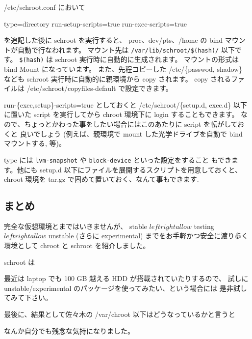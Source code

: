 \documentclass[mingoth,a4paper]{jsarticle}
\begin{document}
/etc/schroot.conf において
\begin{commandline}
type=directory
run-setup-scripts=true
run-exec-scripts=true
\end{commandline}
を追記した後に schroot を実行すると、
proc、dev/pts、/home の bind マウントが自動で行なわれます。
マウント先は {\tt /var/lib/schroot/\$(hash)/} 以下です。
{\tt \$(hash)} は schroot 実行時に自動的に生成されます。
マウントの形式は bind Mount になっています。
また、先程コピーした /etc/\{passwod, shadow\} なども
schroot 実行時に自動的に親環境から copy されます。
copy されるファイルは /etc/schroot/copyfiles-default で設定できます。

run-\{exec,setup\}-scripts=true としておくと
/etc/schroot/\{setup.d, exec.d\} 以下に置いた script を実行してから
chroot 環境下に login することもできます。
なので、ちょっとかわった事をしたい場合にはこのあたりに script を転がしておくと
良いでしょう
(例えば、親環境で mount した光学ドライブを自動で bind マウントする, 等)。

type には {\tt lvm-snapshot} や {\tt block-device} といった設定をすること
もできます。他にも setup.d 以下にファイルを展開するスクリプトを用意しておくと、
chroot 環境を tar.gz で固めて置いておく、なんて事もできます.

\subsection{まとめ}

完全な仮想環境とまではいきませんが、
stable $leftrightallow$
testing $leftrightallow$
unstable (さらに experimental) までをお手軽かつ安全に渡り歩く環境として
chroot と schroot を紹介しました。

schroot は

最近は laptop でも 100 GB 越える HDD が搭載されていたりするので、
試しに unstable/experimental のパッケージを使ってみたい、という場合には
是非試してみて下さい。

最後に、結果として佐々木の /var/chroot 以下はどうなっているかと言うと
なんか自分でも残念な気持になりました。
\end{document}
